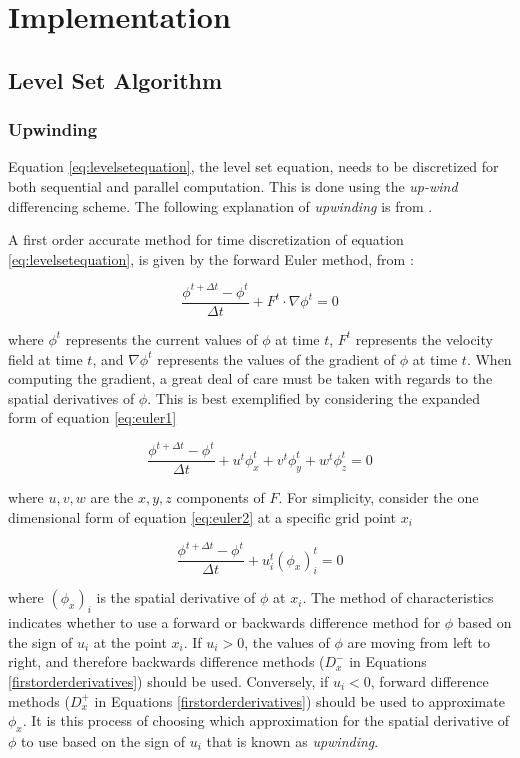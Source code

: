 \chapter{Implementation}

\section{Level Set Algorithm}\label{levelsetalgorithm}

\subsection{Upwinding}\label{upwinding}
Equation \eqref{eq:levelsetequation}, the level set equation, needs to be discretized for both sequential and parallel computation. This is done using the \textit{up-wind} differencing scheme. The following explanation of \textit{upwinding} is from \cite{osher2003lsm}.

A first order accurate method for time discretization of equation \eqref{eq:levelsetequation}, is given by the forward Euler method, from \cite{osher2003lsm}:

\begin{equation}
\frac{\phi^{t+\Delta t}-\phi^t}{\Delta t} +F^{t}\cdot{\nabla{\phi^{t}}} = 0
\label{eq:euler1}
\end{equation}

where $\phi^{t}$ represents the current values of $\phi$ at time $t$, $F^{t}$ represents the velocity field at time $t$, and  $\nabla{\phi^{t}}$ represents the values of the gradient of $\phi$ at time $t$. When computing the gradient, a great deal of care must be taken with regards to the spatial derivatives of $\phi$. This is best exemplified by considering the expanded form of equation \eqref{eq:euler1}

\begin{equation}
\frac{\phi^{t+\Delta t}-\phi^t}{\Delta t} +u^{t}\phi_x^t+v^{t}\phi_y^t+w^{t}\phi_z^t = 0
\label{eq:euler2}
\end{equation}

where $u,v,w$ are the $x,y,z$ components of $F$. For simplicity, consider the one dimensional form of equation \eqref{eq:euler2} at a specific grid point $x_i$ 

\begin{equation}
\frac{\phi^{t+\Delta t}-\phi^t}{\Delta t} +u_i^{t}(\phi_x)_i^t = 0
\label{eq:euler3}
\end{equation}

where $(\phi_x)_i$ is the spatial derivative of $\phi$ at $x_i$. The method of characteristics indicates whether to use a forward or backwards difference method for $\phi$ based on the sign of $u_i$ at the point $x_i$. If $u_i > 0$, the values of $\phi$ are moving from left to right, and therefore backwards difference methods ($D_x^-$ in Equations \ref{firstorderderivatives}) should be used. Conversely, if $u_i<0$, forward difference methods ($D_x^+$ in Equations \ref{firstorderderivatives}) should be used to approximate $\phi_x$. It is this process of choosing which approximation for the spatial derivative of $\phi$ to use based on the sign of $u_i$ that is known as \textit{upwinding}. 

